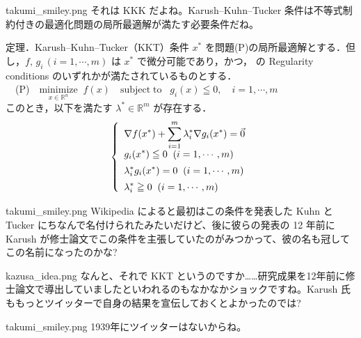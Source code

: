 \documentclass[b5paper,xelatex,ja=standard,10pt]{bxjsarticle}
\begin{document}
\begin{SERIFU}[colback=PaleGold, colbacktitle=PaleGold2]{takumi_smiley.png}
それは KKK だよね。Karush–Kuhn–Tucker 条件は不等式制約付きの最適化問題の局所最適解が満たす必要条件だね。
\end{SERIFU}

\begin{PROP}[colback=White]{定理．Karush–Kuhn–Tucker（KKT）条件}
$x^\ast$ を問題(P)の局所最適解とする．但し，$f, \, g_i \, (i = 1, \cdots, m)$ は $x^\ast$ で微分可能であり，かつ，\cite{wikipedia_en} の Regularity conditions のいずれかが満たされているものとする．
\\[5pt]
　(P)　$\displaystyle \underset{x \in \mathbb{R}^n}{\mathrm{minimize}} \; \; f(x)  \quad  \mathrm{subject \; to}   \; \; \; g_i(x) \leqq 0,  \quad i = 1, \cdots, m $
\\[5pt]
このとき，以下を満たす $\lambda^\ast \in \mathbb{R}^m$ が存在する．
\begin{eqnarray*}
\left\{
\begin{array}{l}
\displaystyle \nabla f (x^\ast) + \sum_{i=1}^m \lambda^\ast_i \nabla g_i (x^\ast) = \vec{0} \\[5pt]
\displaystyle g_i(x^\ast) \leqq 0 \; \; (i = 1, \cdots, m) \\[5pt]
\displaystyle \lambda^\ast_i g_i (x^\ast) = 0 \; \; (i = 1, \cdots, m) \\[5pt]
\displaystyle \lambda^\ast_i \geqq 0 \; \; (i = 1, \cdots, m) \notag
\end{array}
\right.
\end{eqnarray*}
\end{PROP}

\begin{SERIFU}[colback=PaleGold, colbacktitle=PaleGold2]{takumi_smiley.png}
Wikipedia \cite{wikipedia_en} によると最初はこの条件を発表した Kuhn と Tucker にちなんで名付けられたみたいだけど、後に彼らの発表の 12 年前に Karush が修士論文でこの条件を主張していたのがみつかって、彼の名も冠してこの名前になったのかな?
\end{SERIFU}

\begin{SERIFU}[colback=PaleIris, colbacktitle=PaleIris2]{kazusa_idea.png}
なんと、それで KKT というのですか……研究成果を12年前に修士論文で導出していましたといわれるのもなかなかショックですね。Karush 氏ももっとツイッターで自身の結果を宣伝しておくとよかったのでは?
\end{SERIFU}

\begin{SERIFU}[colback=PaleGold, colbacktitle=PaleGold2]{takumi_smiley.png}
1939年にツイッターはないからね。
\end{SERIFU}
\end{document}
